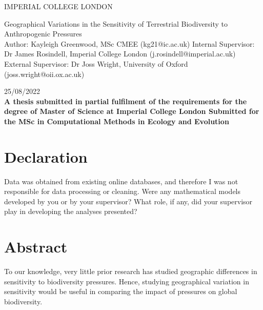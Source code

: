 \documentclass[11pt, a4paper, titlepage]{article}
\begin{document}
    \begin{titlepage}
    \begin{center}
            {\large IMPERIAL COLLEGE LONDON}
    \end{center}
    
    \vspace*{\fill}
    
    \begin{center}
        {\Huge 
    	 Geographical Variations in the Sensitivity of Terrestrial Biodiversity to Anthropogenic Pressures}
        \\[2in]
        Author: Kayleigh Greenwood, MSc CMEE (kg21@ic.ac.uk)
        \bigskip
        \newline
       Internal Supervisor: Dr James Rosindell, Imperial College London (j.rosindell@imperial.ac.uk)
       \bigskip
       \newline
        External Supervisor: Dr Joss Wright, University of Oxford (joss.wright@oii.ox.ac.uk)
        \bigskip
        \newline

        25/08/2022
        \\[2in]
        
        {\bfseries A thesis submitted in partial fulfilment of the requirements for the degree of Master of Science at Imperial College London \newline \newline Submitted for the MSc in Computational Methods in Ecology and Evolution }

        

    
	\end{center}
    \vspace{\fill}
    
    \end{titlepage}
	\section*{Declaration}
	\begin{center}
	Data was obtained from existing online databases, and therefore I was not responsible for data processing or cleaning. \newline
	Were any mathematical models developed by you or by your supervisor? \newline
	What role, if any, did your supervisor play in developing the analyses presented?
	\end{center}
	\newpage
	
	\section*{Abstract}
	 To our knowledge, very little prior research has studied geographic differences in sensitivity to biodiversity pressures. Hence, studying geographical variation in  sensitivity would be useful in comparing the impact of pressures on global biodiversity.
	
\end{document}
